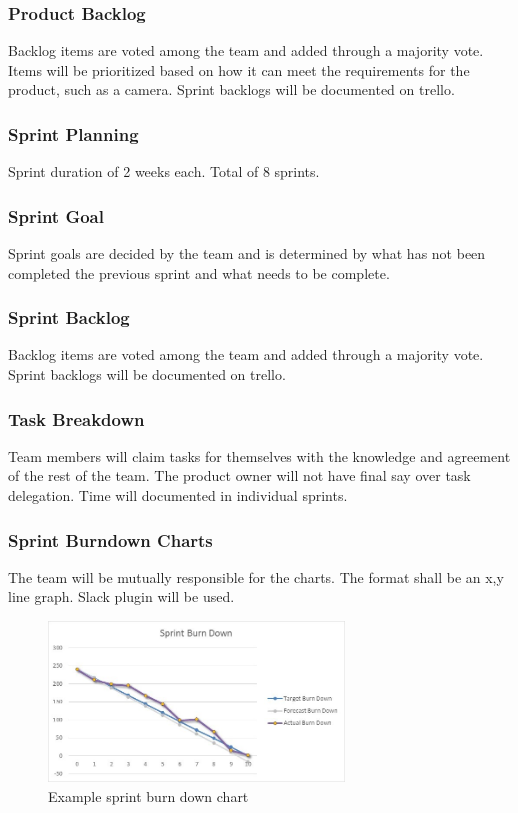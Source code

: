 \subsubsection{Product Backlog}
Backlog items are voted among the team and added through a majority vote. Items will be prioritized based on how it can meet the requirements for the product, such as a camera. Sprint backlogs will be documented on trello.

\subsubsection{Sprint Planning}
Sprint duration of 2 weeks each. Total of 8 sprints.

\subsubsection{Sprint Goal}
Sprint goals are decided by the team and is determined by what has not been completed the previous sprint and what needs to be complete.

\subsubsection{Sprint Backlog}
Backlog items are voted among the team and added through a majority vote. Sprint backlogs will be documented on trello.

\subsubsection{Task Breakdown}
Team members will claim tasks for themselves with the knowledge and agreement of the rest of the team.  The product owner will not have final say over task delegation.  Time will documented in individual sprints.

\subsubsection{Sprint Burndown Charts}
The team will be mutually responsible for the charts.  The format shall be an x,y line graph.  Slack plugin will be used.

\begin{figure}[h!]
    \centering
    \includegraphics[width=0.7\textwidth]{images/burndownchart}
    \caption{Example sprint burn down chart}
\end{figure}

